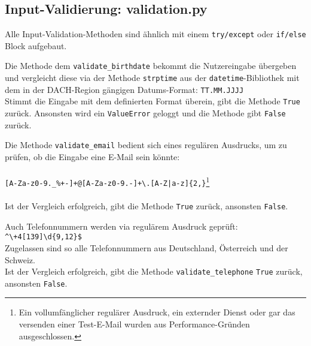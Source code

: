         \subsection{Input-Validierung: validation.py} \label{Implementierung: validation.py}
            Alle Input-Validation-Methoden sind ähnlich mit einem \verb|try/except| oder \verb|if/else| Block aufgebaut.

                Die Methode dem \verb|validate_birthdate| bekommt die Nutzereingabe übergeben und vergleicht diese via der Methode \verb|strptime| aus der \verb|datetime|-Bibliothek \cite{datetime} mit dem in der DACH-Region gängigen Datums-Format: \verb|TT.MM.JJJJ| \\
                Stimmt die Eingabe mit dem definierten Format überein, gibt die Methode \verb|True| zurück. Ansonsten wird ein \verb|ValueError| geloggt und die Methode gibt \verb|False| zurück.

                Die Methode \verb|validate_email| bedient sich eines regulären Ausdrucks, um zu prüfen, ob die Eingabe eine E-Mail sein könnte: \\
                \\
                \verb/[A-Za-z0-9._%+-]+@[A-Za-z0-9.-]+\.[A-Z|a-z]{2,}/\footnote{Ein vollumfänglicher regulärer Ausdruck, ein externder Dienst oder gar das versenden einer Test-E-Mail wurden aus Performance-Gründen ausgeschlossen.} \\ 
                \\
                Ist der Vergleich erfolgreich, gibt die Methode \verb|True| zurück, ansonsten \verb|False|.

                Auch Telefonnummern werden via regulärem Ausdruck geprüft: \\\verb/^\+4[139]\d{9,12}$/ \\
                Zugelassen sind so alle Telefonnummern aus Deutschland, Österreich und der Schweiz.\\
                Ist der Vergleich erfolgreich, gibt die Methode \verb|validate_telephone| \verb|True| zurück, ansonsten \verb|False|.

